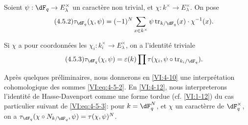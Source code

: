 Soient $\psi:\dF_q\to E_\lambda^\times$ un caract\`ere non trivial, et 
$\chi:k^\times \to E_\lambda^\times$. On pose 
\begin{equation*}\tag{4.5.2}\label{VI:eq:4-5-2}
  \tau_{\dF_q}(\chi,\psi) = (-1)^N \sum_{x\in k^\times} \psi \tr_{k/\dF_q}(x) \cdot \chi^{-1}(x) \text{.} 
\end{equation*}

Si $\chi$ a pour coordonn\'ees les $\chi_i:k_i^\times \to E_\lambda^\times$, on 
a l'identit\'e triviale 
\begin{equation*}\tag{4.5.3}\label{VI:eq:4-5-3}
  \tau_{\dF_q}(\chi,\psi) = \varepsilon(k) \prod \tau(\chi_i,\psi\circ \tr_{k_i/\dF_q}) \text{.}
\end{equation*}

Apr\`es quelques pr\'eliminaires, nous donnerons en \ref{VI:4-10} une 
interpr\'etation cohomologique des sommes \eqref{VI:eq:4-5-2}. En 
\ref{VI:4-12}, nous interpreterons l'identit\'e de Hasse-Davenport comme une 
forme tordue (cf. \ref{VI:1-12}) du cas particulier suivant de 
\eqref{VI:eq:4-5-3}: pour $k=\dF_q^N$, et $\chi$ un caract\`erre de 
$\dF_q^\times$, on a 
$\tau_{\dF_q}(\chi\circ N_{k/\dF_q},\psi)=\tau(\chi,\psi)^N$. 




